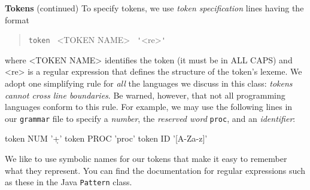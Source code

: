 \begin{minipage}[t]{\sw}
\slidenumber
\LARGE
{\bf Tokens} (continued)\exx
To specify tokens, we use {\em token specification} lines
having the format
\begin{quote}
\verb'token ' <TOKEN NAME> \verb" '"<re>\verb"'"
\end{quote}
where <TOKEN NAME> identifies the token (it must be in ALL CAPS)
and <re> is a regular expression that defines the structure
of the token's lexeme.\exx
We adopt one simplifying rule
for {\em all} the languages we discuss in this class:
{\em \mbox{tokens} cannot cross line boundaries}.
Be warned, however,
that not all programming languages conform to this rule.\exx
For example, we may use the following lines
in our \verb'grammar' file to specify 
a {\em number},
the {\em reserved word} \verb'proc',
and an {\em identifier}:
\begin{qv}
token NUM '\d+'
token PROC 'proc'
token ID '[A-Za-z]\w*'
\end{qv}
We like to use symbolic names for our tokens
that make it easy to remember what they represent.\exx
You can find the documentation for regular expressions
such as these in the Java \verb'Pattern' class.\exx
\end{minipage}
\clearpage

